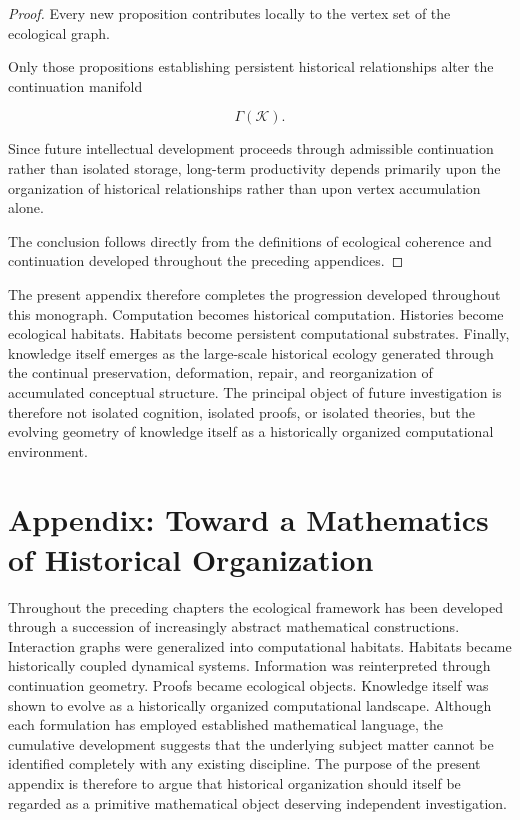 \documentclass[12pt,oneside]{article}
\theoremstyle{remark}
\begin{document}
\begin{proof}

Every new proposition contributes locally to the vertex set of the ecological
graph.

Only those propositions establishing persistent historical relationships alter
the continuation manifold

\[
\Gamma(\mathcal K).
\]

Since future intellectual development proceeds through admissible continuation
rather than isolated storage, long-term productivity depends primarily upon the
organization of historical relationships rather than upon vertex accumulation
alone.

The conclusion follows directly from the definitions of ecological coherence
and continuation developed throughout the preceding appendices.

\end{proof}

The present appendix therefore completes the progression developed throughout
this monograph. Computation becomes historical computation. Histories become
ecological habitats. Habitats become persistent computational substrates.
Finally, knowledge itself emerges as the large-scale historical ecology
generated through the continual preservation, deformation, repair, and
reorganization of accumulated conceptual structure. The principal object of
future investigation is therefore not isolated cognition, isolated proofs, or
isolated theories, but the evolving geometry of knowledge itself as a
historically organized computational environment.

\section{Appendix: Toward a Mathematics of Historical Organization}

Throughout the preceding chapters the ecological framework has been developed
through a succession of increasingly abstract mathematical constructions.
Interaction graphs were generalized into computational habitats. Habitats became
historically coupled dynamical systems. Information was reinterpreted through
continuation geometry. Proofs became ecological objects. Knowledge itself was
shown to evolve as a historically organized computational landscape. Although
each formulation has employed established mathematical language, the cumulative
development suggests that the underlying subject matter cannot be identified
completely with any existing discipline. The purpose of the present appendix is
therefore to argue that historical organization should itself be regarded as a
primitive mathematical object deserving independent investigation.
\end{document}
